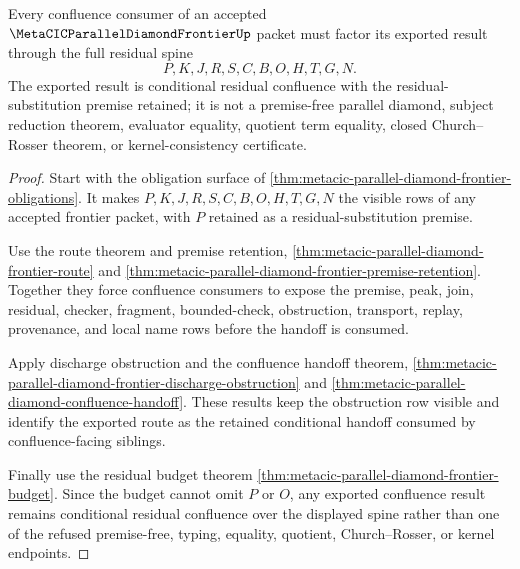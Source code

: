 \begin{theorem}
\label{thm:metacic-parallel-diamond-frontier-residual-confluence}
Every confluence consumer of an accepted $\MetaCICParallelDiamondFrontierUp$ packet must factor its exported result through the full residual spine
$$
P,K,J,R,S,C,B,O,H,T,G,N .
$$
The exported result is conditional residual confluence with the residual-substitution premise retained; it is not a premise-free parallel diamond, subject reduction theorem, evaluator equality, quotient term equality, closed Church--Rosser theorem, or kernel-consistency certificate.
\end{theorem}
\begin{proof}
Start with the obligation surface of \autoref{thm:metacic-parallel-diamond-frontier-obligations}. It makes $P,K,J,R,S,C,B,O,H,T,G,N$ the visible rows of any accepted frontier packet, with $P$ retained as a residual-substitution premise.

Use the route theorem and premise retention, \autoref{thm:metacic-parallel-diamond-frontier-route} and \autoref{thm:metacic-parallel-diamond-frontier-premise-retention}. Together they force confluence consumers to expose the premise, peak, join, residual, checker, fragment, bounded-check, obstruction, transport, replay, provenance, and local name rows before the handoff is consumed.

Apply discharge obstruction and the confluence handoff theorem, \autoref{thm:metacic-parallel-diamond-frontier-discharge-obstruction} and \autoref{thm:metacic-parallel-diamond-confluence-handoff}. These results keep the obstruction row visible and identify the exported route as the retained conditional handoff consumed by confluence-facing siblings.

Finally use the residual budget theorem \autoref{thm:metacic-parallel-diamond-frontier-budget}. Since the budget cannot omit $P$ or $O$, any exported confluence result remains conditional residual confluence over the displayed spine rather than one of the refused premise-free, typing, equality, quotient, Church--Rosser, or kernel endpoints.
\end{proof}


